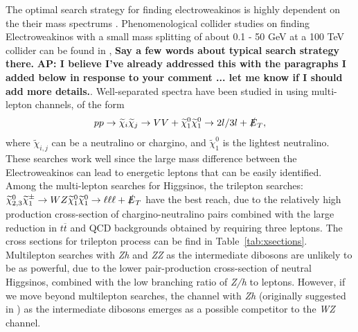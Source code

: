 \documentclass[a4paper,11pt]{article}
\newcommand{\Shufang}[1]{{\bf\color{Maroon}  #1}}
\newcommand{\Adarsh}[1]{{\bf\color{RoyalBlue} AP: #1}}
\newcommand{\met}{{\slashed{E}_T}}
\begin{document}
The optimal search strategy for finding electroweakinos is highly dependent on
the their mass spectrums \citep{Han:2013kza}.  Phenomenological collider studies on finding
Electroweakinos with a small mass splitting of about 0.1 - 50 GeV at a 100 TeV collider can be
found in \citep{Low:2014cba, Bramante:2014tba, Berlin:2015aba, Cirelli:2014dsa},
\Shufang{Say a few words about typical search strategy there.} \Adarsh{I
believe I've already addressed this with the paragraphs I added below in response
to your comment ... let me know if I should add more details.}.
Well-separated spectra have been studied in \citep{Gori:2014oua,
Acharya:2014pua} using
multi-lepton channels, of the form 
\begin{equation}
pp\rightarrow \widetilde{\chi}_i\widetilde{\chi}_j\rightarrow VV +
\widetilde{\chi}_1^0\widetilde{\chi}_1^0\rightarrow 2l/3l +  
\met,
\end{equation}
\noindent where $\widetilde{\chi}_{i,j}$ can be a neutralino or chargino, and
$\widetilde{\chi}_1^0$ is the lightest neutralino. These searches work well since
the large mass difference between the Electroweakinos can lead to energetic
leptons that can be easily identified. Among the multi-lepton searches for
Higgsinos, the trilepton searches: $\widetilde\chi_{2,3}^0\widetilde\chi_1^\pm\rightarrow WZ\widetilde\chi_1^0\widetilde\chi_1^0\rightarrow \ell\ell\ell + \met$ have the best reach, due to the relatively high production cross-section of
chargino-neutralino pairs combined with the large reduction in $t\overline{t}$
and QCD backgrounds obtained by requiring three leptons.   The cross sections for trilepton process can be find in Table~\ref{tab:xsections}. Multilepton searches
with \emph{Zh} and \emph{ZZ} as the intermediate dibosons are unlikely to be as powerful,
due to the lower pair-production cross-section of neutral Higgsinos, combined
with the low branching ratio of \emph{Z/h} to leptons. However, if we move beyond
multilepton searches, the channel with \emph{Zh} (originally suggested in
\citep{Han:2013kza}) as the intermediate dibosons emerges as a possible
competitor to the \emph{WZ} channel.  
\end{document}
